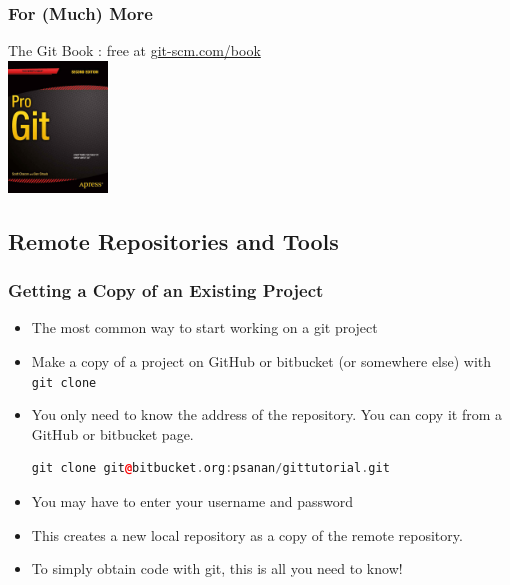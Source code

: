 \documentclass{beamer}
\begin{document}
\begin{frame}[fragile]
\frametitle{For (Much) More}
The Git Book : free at \href{https://git-scm.com/book}{git-scm.com/book} \\
\includegraphics[width=100px]{progit2}
\end{frame}

\subsection{Remote Repositories and Tools}

\begin{frame}[fragile]
\frametitle{Getting a Copy of an Existing Project}
\begin{itemize}
\item
The most common way to start working on a git project 
\item Make a copy of a project on GitHub or bitbucket (or somewhere else) with \lstinline{git clone}
\item You only need to know the address of the repository. You can copy it from a GitHub or bitbucket page.
\begin{lstlisting}[language=C++]
git clone git@bitbucket.org:psanan/gittutorial.git
\end{lstlisting}
\item You may have to enter your username and password
\item This creates a new local repository as a copy of the remote repository.
\item To simply obtain code with git, this is all you need to know!
\end{itemize}
\end{frame}
\end{document}
